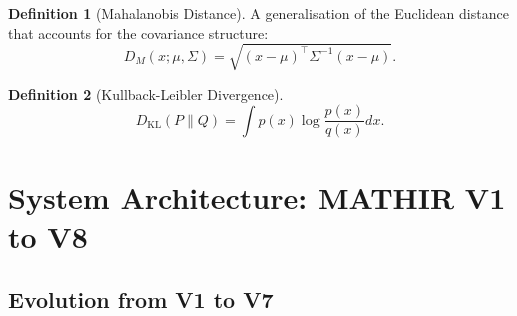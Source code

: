 \documentclass[12pt,a4paper]{article}
\theoremstyle{definition}
\newtheorem{definition}{Definition}[section]
\theoremstyle{remark}
\newcommand{\KL}{D_{\mathrm{KL}}}
\begin{document}
\begin{definition}[Mahalanobis Distance]
A generalisation of the Euclidean distance that accounts for the covariance structure:
\begin{equation}
    D_M(x; \mu, \Sigma) = \sqrt{(x - \mu)^\top \Sigma^{-1} (x - \mu)}.
\end{equation}
\end{definition}

\begin{definition}[Kullback-Leibler Divergence]
\begin{equation}
    \KL(P \| Q) = \int p(x) \log \frac{p(x)}{q(x)} dx.
\end{equation}
\end{definition}

\section{System Architecture: MATHIR V1 to V8}
\label{sec:architecture}

\subsection{Evolution from V1 to V7}
\end{document}
